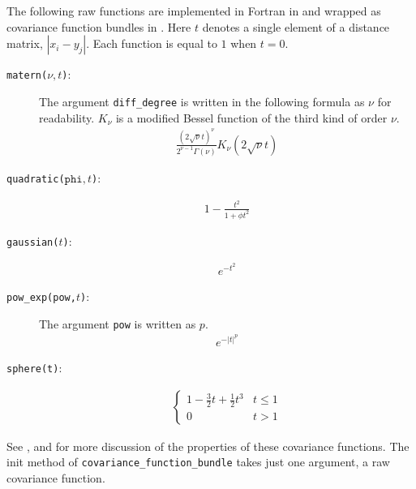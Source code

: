 \documentclass[]{manual}
\begin{document}
The following raw functions are implemented in Fortran in  and wrapped as covariance function bundles in . Here $t$ denotes a single element of a distance matrix, $|x_i-y_j|$. Each function is equal to $1$ when $t=0$.
\begin{description}
    \item[\texttt{matern($\nu,t$)}:] The argument \texttt{diff_degree} is written in the following formula as $\nu$ for readability. $K_\nu$ is a modified Bessel function of the third kind of order $\nu$.
    \begin{eqnarray*}
        \frac{(2\sqrt{\nu}t)^\nu}{2^{\nu-1}\Gamma(\nu)}K_\nu(2\sqrt{\nu}t)
    \end{eqnarray*}
    \item[\texttt{quadratic($\texttt{phi},t$)}:]
    \begin{eqnarray*}
        1-\frac{t^2}{1+\phi t^2}
    \end{eqnarray*}
    \item[\texttt{gaussian($t$)}:]
    \begin{eqnarray*}
        e^{-t^2}
    \end{eqnarray*}
    \item[\texttt{pow_exp(\texttt{pow},$t$)}:] The argument \texttt{pow} is written as $p$.
    \begin{eqnarray*}
        e^{-|t|^p}
    \end{eqnarray*}
    \item[\texttt{sphere(t)}:]
    \begin{eqnarray}
        \left\{
        \begin{array}{ll}
            1-\frac{3}{2}t+\frac{1}{2}t^3& t\le 1\\
            0 & t > 1
        \end{array} \right.
    \end{eqnarray}
\end{description}

See  \cite{banerjee} ,  \cite{diggle} and  \cite{stein}for more discussion of the properties of these covariance functions. The init method of \texttt{covariance_function_bundle} takes just one argument, a raw covariance function.
\end{document}
